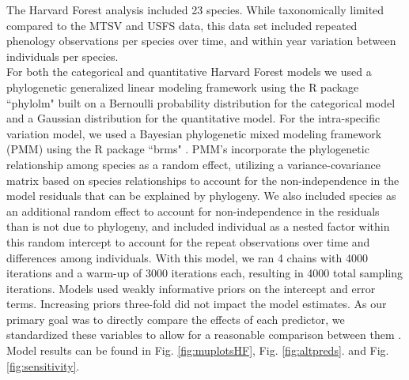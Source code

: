 \documentclass[11pt]{article}
\begin{document}
  \noindent The Harvard Forest analysis included 23 species. While taxonomically limited compared to the MTSV and USFS data, this data set included repeated phenology observations per species over time, and within year variation between individuals per species. \\ 
  
  \noindent For both the categorical and quantitative Harvard Forest models we used a phylogenetic generalized linear modeling framework \citep{Ives2010} using the R package ``phylolm" \citep{Ho2014} built on a Bernoulli probability distribution for the categorical model and a Gaussian distribution for the quantitative model. For the intra-specific variation model, we used a Bayesian phylogenetic mixed modeling framework (PMM) \citep{Garamszegi2014} using the R package ``brms" \citep{Burkner2018}. PMM's incorporate the phylogenetic relationship among species as a random effect, utilizing a variance-covariance matrix based on species relationships to account for the non-independence in the model residuals that can be explained by phylogeny. We also included species as an additional random effect to account for non-independence in the residuals than is not due to phylogeny, and included individual as a nested factor within this random intercept to account for the repeat observations over time and differences among individuals. With this model, we ran 4 chains with 4000 iterations and a warm-up of 3000 iterations each, resulting in 4000 total sampling iterations. Models used weakly informative priors on the intercept and error terms. Increasing priors three-fold did not impact the model estimates. As our primary goal was to directly compare the effects of each predictor, we standardized these variables to allow for a reasonable comparison between them {\citep{Gelman2007}. Model results can be found in Fig. \ref{fig:muplotsHF}, Fig. \ref{fig:altpreds}. and Fig. \ref{fig:sensitivity}.\\
  
}
\end{document}
